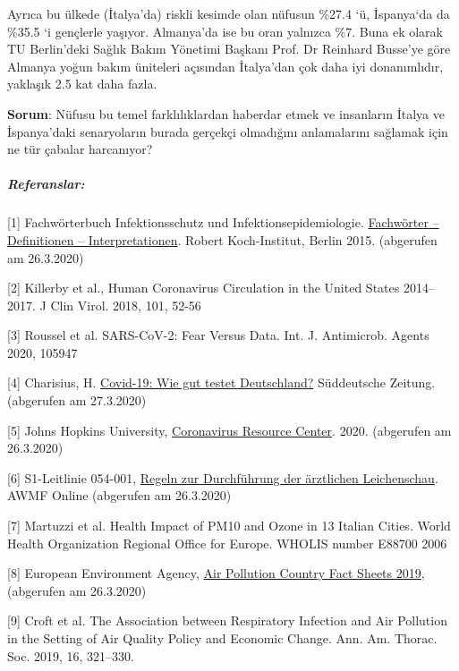 Ayrıca bu ülkede (İtalya'da) riskli kesimde olan nüfusun \%27.4 `ü,
İspanya`da da \%35.5 `i gençlerle yaşıyor. Almanya'da ise bu oran
yalnızca \%7. Buna ek olarak TU Berlin'deki Sağlık Bakım Yönetimi
Başkanı Prof. Dr Reinhard Busse'ye göre Almanya yoğun bakım üniteleri
açısından İtalya'dan çok daha iyi donanımlıdır, yaklaşık 2.5 kat daha
fazla.

\textbf{Sorum}: Nüfusu bu temel farklılıklardan haberdar etmek ve
insanların İtalya ve İspanya'daki senaryoların burada gerçekçi
olmadığını anlamalarını sağlamak için ne tür çabalar harcanıyor?

\hypertarget{referanslar}{%
\subparagraph{\texorpdfstring{\textbf{Referanslar:}}{Referanslar:}}\label{referanslar}}

{[}1{]} Fachwörterbuch Infektionsschutz und Infektionsepidemiologie.
\href{https://www.rki.de/DE/Content/Service/Publikationen/Fachwoerterbuch_Infektionsschutz.html}{Fachwörter
-- Definitionen -- Interpretationen}. Robert Koch-Institut, Berlin 2015.
(abgerufen am 26.3.2020)

{[}2{]} Killerby et al., Human Coronavirus Circulation in the United
States 2014--2017. J Clin Virol. 2018, 101, 52-56

{[}3{]} Roussel et al. SARS-CoV-2: Fear Versus Data. Int. J. Antimicrob.
Agents 2020, 105947

{[}4{]} Charisius, H.
\href{https://www.sueddeutsche.de/gesundheit/covid-19-coronavirus-testverfahren-1.4855487}{Covid-19:
Wie gut testet Deutschland?} Süddeutsche Zeitung. (abgerufen am
27.3.2020)

{[}5{]} Johns Hopkins University,
\href{https://coronavirus.jhu.edu/map.html}{Coronavirus Resource
Center}. 2020. (abgerufen am 26.3.2020)

{[}6{]} S1-Leitlinie 054-001,
\href{https://www.awmf.org/uploads/tx_szleitlinien/054-002l_S1_Regeln-zur-Durchfuehrung-der-aerztlichen-Leichenschau_2018-02_01.pdf}{Regeln
zur Durchführung der ärztlichen Leichenschau}. AWMF Online (abgerufen am
26.3.2020)

{[}7{]} Martuzzi et al. Health Impact of PM10 and Ozone in 13 Italian
Cities. World Health Organization Regional Office for Europe. WHOLIS
number E88700 2006

{[}8{]} European Environment Agency,
\href{https://www.eea.europa.eu/themes/air/country-fact-sheets/2019-country-fact-sheets}{Air
Pollution Country Fact Sheets 2019}, (abgerufen am 26.3.2020)

{[}9{]} Croft et al. The Association between Respiratory Infection and
Air Pollution in the Setting of Air Quality Policy and Economic Change.
Ann. Am. Thorac. Soc. 2019, 16, 321--330.

